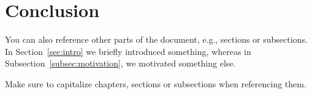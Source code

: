 \section{Conclusion}
\label{sec:conclusion}

You can also reference other parts of the document, e.g., sections or subsections.
In Section~\ref{sec:intro} we briefly introduced something, whereas in Subsection~\ref{subsec:motivation}, we motivated something else.

Make sure to capitalize chapters, sections or subsections when referencing them.